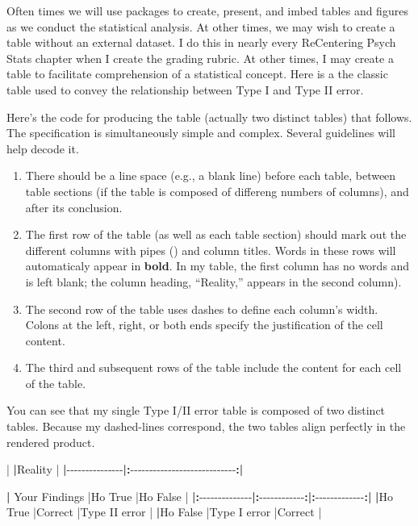 \documentclass[
]{book}
\newenvironment{Shaded}{\begin{snugshade}}{\end{snugshade}}
\newcommand{\ErrorTok}[1]{\textcolor[rgb]{0.64,0.00,0.00}{\textbf{#1}}}
\newcommand{\NormalTok}[1]{#1}
\newcommand{\SpecialCharTok}[1]{\textcolor[rgb]{0.00,0.00,0.00}{#1}}
\providecommand{\tightlist}{%
  \setlength{\itemsep}{0pt}\setlength{\parskip}{0pt}}
\begin{document}
Often times we will use packages to create, present, and imbed tables and figures as we conduct the statistical analysis. At other times, we may wish to create a table without an external dataset. I do this in nearly every ReCentering Psych Stats chapter when I create the grading rubric. At other times, I may create a table to facilitate comprehension of a statistical concept. Here is a the classic table used to convey the relationship between Type I and Type II error.

Here's the code for producing the table (actually two distinct tables) that follows. The specification is simultaneously simple and complex. Several guidelines will help decode it.

\begin{enumerate}
\def\labelenumi{\arabic{enumi}.}
\tightlist
\item
  There should be a line space (e.g., a blank line) before each table, between table sections (if the table is composed of differeng numbers of columns), and after its conclusion.
\item
  The first row of the table (as well as each table section) should mark out the different columns with pipes (\texttt{\textbar{}}) and column titles. Words in these rows will automaticaly appear in \textbf{bold}. In my table, the first column has no words and is left blank; the column heading, ``Reality,'' appears in the second column).
\item
  The second row of the table uses dashes to define each column's width. Colons at the left, right, or both ends specify the justification of the cell content.
\item
  The third and subsequent rows of the table include the content for each cell of the table.
\end{enumerate}

You can see that my single Type I/II error table is composed of two distinct tables. Because my dashed-lines correspond, the two tables align perfectly in the rendered product.

\begin{Shaded}
\begin{Highlighting}[]
\SpecialCharTok{|}               \ErrorTok{|}\NormalTok{Reality                       }\SpecialCharTok{|}
\ErrorTok{|}\SpecialCharTok{{-}{-}{-}{-}{-}{-}{-}{-}{-}{-}{-}{-}{-}{-}{-}}\ErrorTok{|:}\SpecialCharTok{{-}{-}{-}{-}{-}{-}{-}{-}{-}{-}{-}{-}{-}{-}{-}{-}{-}{-}{-}{-}{-}{-}{-}{-}{-}{-}{-}{-}}\ErrorTok{:|}

\ErrorTok{|}\NormalTok{ Your Findings }\SpecialCharTok{|}\NormalTok{Ho True       }\SpecialCharTok{|}\NormalTok{Ho False       }\SpecialCharTok{|}
\ErrorTok{|:}\SpecialCharTok{{-}{-}{-}{-}{-}{-}{-}{-}{-}{-}{-}{-}{-}{-}}\ErrorTok{|:}\SpecialCharTok{{-}{-}{-}{-}{-}{-}{-}{-}{-}{-}{-}{-}}\ErrorTok{:|:}\SpecialCharTok{{-}{-}{-}{-}{-}{-}{-}{-}{-}{-}{-}{-}{-}}\ErrorTok{:|}
\ErrorTok{|}\NormalTok{Ho True        }\SpecialCharTok{|}\NormalTok{Correct       }\SpecialCharTok{|}\NormalTok{Type II error  }\SpecialCharTok{|}
\ErrorTok{|}\NormalTok{Ho False       }\SpecialCharTok{|}\NormalTok{Type I error  }\SpecialCharTok{|}\NormalTok{Correct        }\SpecialCharTok{|}
\end{Highlighting}
\end{Shaded}
\end{document}
